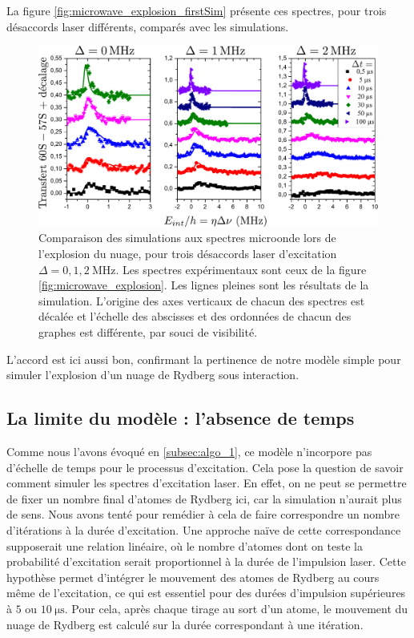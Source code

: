 La figure \eqref{fig:microwave_explosion_firstSim} présente ces spectres, pour trois désaccords laser différents, comparés avec les simulations.
%
\begin{figure}[!h]
\centering
\includegraphics[width=\linewidth]{figures/low_l/expansion_012MHz_fisrtSim}
\caption[Comparaison des simulations aux spectres microonde lors de l'explosion du nuage]{
Comparaison des simulations aux spectres microonde lors de l'explosion du nuage, pour trois désaccords laser d'excitation $\Delta = \num{0}, \num{1}, \SI{2}{\MHz}$.
Les spectres expérimentaux sont ceux de la figure \ref{fig:microwave_explosion}.
Les lignes pleines sont les résultats de la simulation.
L'origine des axes verticaux de chacun des spectres est décalée et l'échelle des abscisses et des ordonnées de chacun des graphes est différente, par souci de visibilité.
}
\label{fig:microwave_explosion_firstSim}
\end{figure}
%
L'accord est ici aussi bon, confirmant la pertinence de notre modèle simple pour simuler l'explosion d'un nuage de Rydberg sous interaction.

\subsection{La limite du modèle : l'absence de temps}
\noindent Comme nous l'avons évoqué en \ref{subsec:algo_1}, ce modèle n'incorpore pas d'échelle de temps pour le processus d'excitation.
Cela pose la question de savoir comment simuler les spectres d'excitation laser.
En effet, on ne peut se permettre de fixer un nombre final d'atomes de Rydberg ici, car la simulation n'aurait plus de sens.
Nous avons tenté pour remédier à cela de faire correspondre un nombre d'itérations à la durée d'excitation.
Une approche naïve de cette correspondance supposerait une relation linéaire, où le nombre d'atomes dont on teste la probabilité d'excitation serait proportionnel à la durée de l'impulsion laser.
Cette hypothèse permet d'intégrer le mouvement des atomes de Rydberg au cours même de l'excitation, ce qui est essentiel pour des durées d'impulsion supérieures à $\num{5}$ ou $\SI{10}{\us}$.
Pour cela, après chaque tirage au sort d'un atome, le mouvement du nuage de Rydberg est calculé sur la durée correspondant à une itération.

